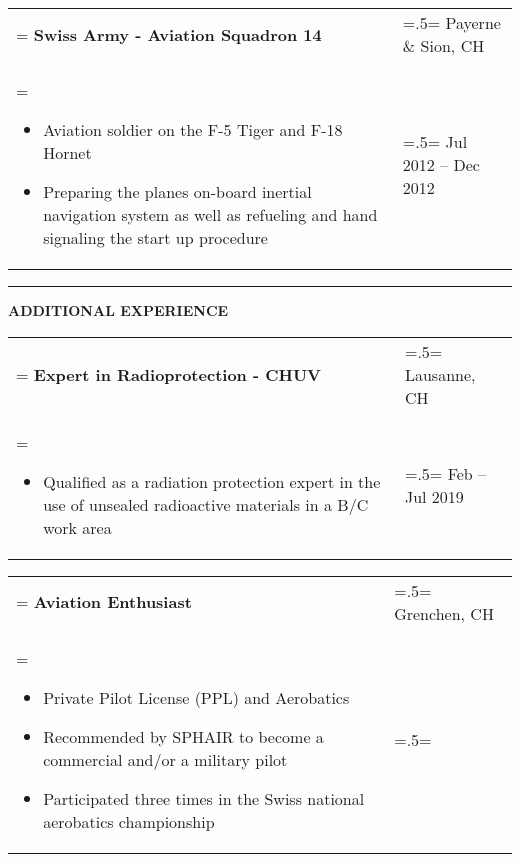 \documentclass[letterpaper, 11pt]{article}
\begin{document}
\begin{tabularx}{1.0\textwidth} { 
   >{\raggedright\arraybackslash\hsize=1.5\hsize\linewidth=\hsize}X 
   >{\raggedleft\arraybackslash\hsize=.5\hsize\linewidth=\hsize}X }
\normalsize
\bf{Swiss Army - Aviation Squadron 14} & Payerne \& Sion, CH\\
\normalfont \begin{itemize}[leftmargin=*,noitemsep,topsep=0pt]
\item Aviation soldier on the F-5 Tiger and F-18 Hornet
\item Preparing the planes on-board inertial navigation system as well as refueling and hand signaling the start up procedure
\end{itemize} & Jul 2012 -- Dec 2012
\end{tabularx}

\begin{center}
\noindent\rule{0.75\textwidth}{1pt}
\end{center}

\begin{center}
\large\bf{ADDITIONAL EXPERIENCE}
\end{center}

\begin{tabularx}{1.0\textwidth} { 
   >{\raggedright\arraybackslash\hsize=1.5\hsize\linewidth=\hsize}X 
   >{\raggedleft\arraybackslash\hsize=.5\hsize\linewidth=\hsize}X }
\normalsize
\bf{Expert in Radioprotection - CHUV} & Lausanne, CH\\
\normalfont \begin{itemize}[leftmargin=*,noitemsep,topsep=0pt]
\item Qualified as a radiation protection expert in the use of unsealed radioactive materials in a B/C work area
\end{itemize} & Feb -- Jul 2019
\end{tabularx}

\begin{tabularx}{1.0\textwidth} { 
   >{\raggedright\arraybackslash\hsize=1.5\hsize\linewidth=\hsize}X 
   >{\raggedleft\arraybackslash\hsize=.5\hsize\linewidth=\hsize}X }
\normalsize
\bf{Aviation Enthusiast} & Grenchen, CH\\
\normalfont \begin{itemize}[leftmargin=*,noitemsep,topsep=0pt]
\item Private Pilot License (PPL) and Aerobatics
\item Recommended by SPHAIR to become a commercial and/or a military pilot
\item Participated three times in the Swiss national aerobatics championship
\end{itemize} & 2014
\end{tabularx}
\end{document}
